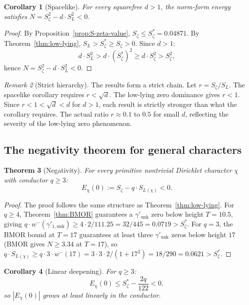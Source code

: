 \documentclass[12pt,reqno]{amsart}
\theoremstyle{plain}
\newtheorem{theorem}{Theorem}[section]
\newtheorem{corollary}[theorem]{Corollary}
\theoremstyle{definition}
\theoremstyle{remark}
\newtheorem{remark}[theorem]{Remark}
\begin{document}
\begin{corollary}[Spacelike]\label{cor:spacelike}
For every squarefree $d > 1$, the norm-form energy satisfies $N = S_\zeta^2 - d \cdot S_L^2 < 0$.
\end{corollary}

\begin{proof}
By Proposition~\ref{prop:S-zeta-value}, $S_\zeta \leq S_\zeta^* = 0.04871$.  By Theorem~\ref{thm:low-lying}, $S_L > S_\zeta^* \geq S_\zeta > 0$.  Since $d > 1$:
\[
d \cdot S_L^2 > d \cdot (S_\zeta^*)^2 \geq d \cdot S_\zeta^2 > S_\zeta^2,
\]
hence $N = S_\zeta^2 - d \cdot S_L^2 < 0$.
\end{proof}

\begin{remark}[Strict hierarchy]\label{rmk:hierarchy}
The results form a strict chain. Let $r = S_\zeta/S_L$. The spacelike corollary requires $r < \sqrt{d}$. The low-lying zero dominance gives $r < 1$. Since $r < 1 < \sqrt{d} < d$ for $d > 1$, each result is strictly stronger than what the corollary requires. The actual ratio $r \approx 0.1$ to $0.5$ for small $d$, reflecting the severity of the low-lying zero phenomenon.
\end{remark}

\subsection{The negativity theorem for general characters}

\begin{theorem}[Negativity]\label{thm:negativity}
For every primitive nontrivial Dirichlet character $\chi$ with conductor $q \geq 3$:
\[
E_\chi(0) := S_\zeta - q \cdot S_{L(\chi)} < 0.
\]
\end{theorem}

\begin{proof}
The proof follows the same structure as Theorem~\ref{thm:low-lying}. For $q \geq 4$, Theorem~\ref{thm:BMOR} guarantees a $\gamma'_{\mathrm{unk}}$ zero below height $T = 10.5$, giving $q \cdot w^-(\gamma'_{1,\mathrm{unk}}) \geq 4 \cdot 2/111.25 = 32/445 = 0.0719 > S_\zeta^*$. For $q = 3$, the BMOR bound at $T = 17$ guarantees at least three $\gamma'_{\mathrm{unk}}$ zeros below height $17$ (BMOR gives $N \geq 3.34$ at $T = 17$), so $q \cdot S_{L(\chi)} \geq q \cdot 3 \cdot w^-(17) = 3 \cdot 3 \cdot 2/(1 + 17^2) = 18/290 = 0.0621 > S_\zeta^*$.
\end{proof}

\begin{corollary}[Linear deepening]\label{cor:linear-deepening}
For $q \geq 3$:
\[
E_\chi(0) \leq S_\zeta^* - \frac{2q}{122} < 0,
\]
so $|E_\chi(0)|$ grows at least linearly in the conductor.
\end{corollary}
\end{document}
